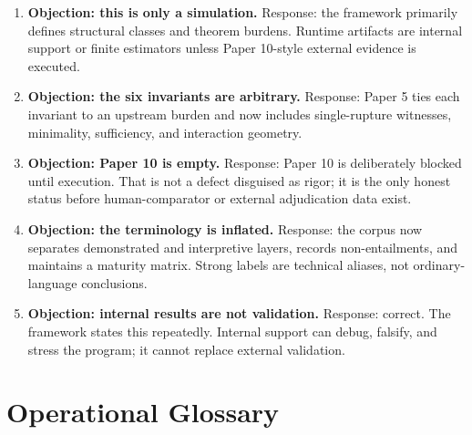 \documentclass[11pt,a4paper]{article}
\theoremstyle{definition}
\begin{document}
\begin{enumerate}[leftmargin=1.5em]
\item \textbf{Objection: this is only a simulation.}
Response: the framework primarily defines structural classes and theorem
burdens. Runtime artifacts are internal support or finite estimators unless
Paper 10-style external evidence is executed.

\item \textbf{Objection: the six invariants are arbitrary.}
Response: Paper 5 ties each invariant to an upstream burden and now includes
single-rupture witnesses, minimality, sufficiency, and interaction geometry.

\item \textbf{Objection: Paper 10 is empty.}
Response: Paper 10 is deliberately blocked until execution. That is not a
defect disguised as rigor; it is the only honest status before human-comparator
or external adjudication data exist.

\item \textbf{Objection: the terminology is inflated.}
Response: the corpus now separates demonstrated and interpretive layers,
records non-entailments, and maintains a maturity matrix. Strong labels are
technical aliases, not ordinary-language conclusions.

\item \textbf{Objection: internal results are not validation.}
Response: correct. The framework states this repeatedly. Internal support can
debug, falsify, and stress the program; it cannot replace external validation.
\end{enumerate}

\section{Operational Glossary}
\end{document}
